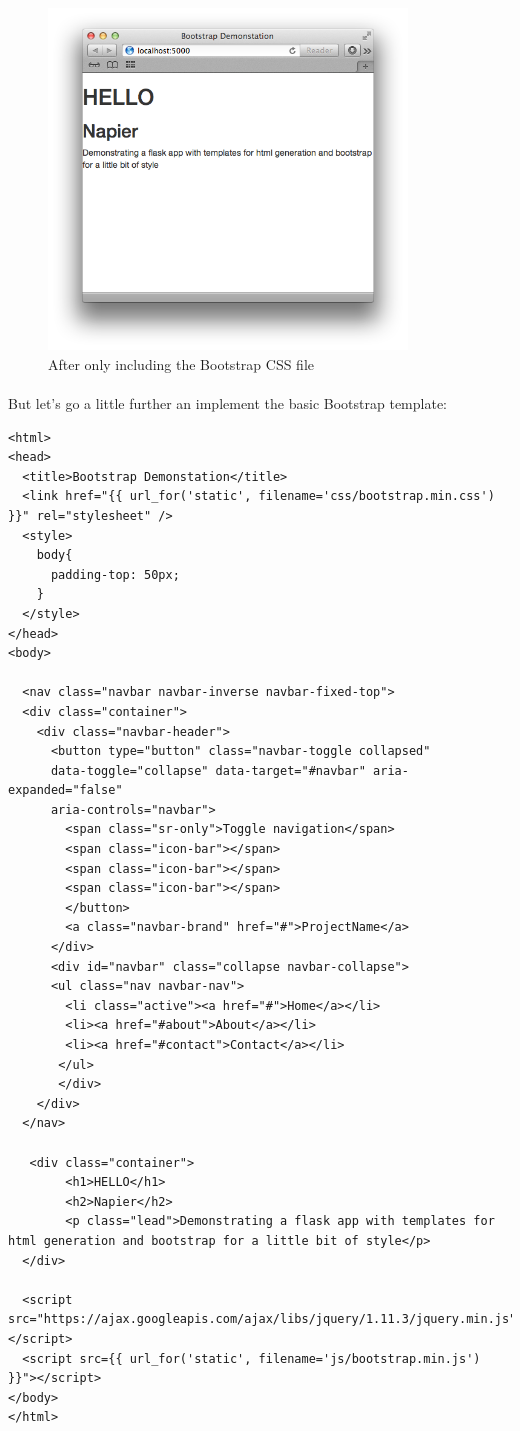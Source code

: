 \documentclass[12pt, a4paper, twoside]{book}
\begin{document}
\begin{figure}[H]
\centering
\includegraphics[width=0.85\textwidth]{images/styled-css.png}
\caption{After only including the Bootstrap CSS file}
\label{fig:styled-css}
\end{figure}

\paragraph{} But let's go a little further an implement the basic Bootstrap template:

\begin{lstlisting}
<html>
<head>
  <title>Bootstrap Demonstation</title>
  <link href="{{ url_for('static', filename='css/bootstrap.min.css') }}" rel="stylesheet" />
  <style>
    body{ 
      padding-top: 50px;
    } 
  </style>
</head>
<body>

  <nav class="navbar navbar-inverse navbar-fixed-top">
  <div class="container">
    <div class="navbar-header">
      <button type="button" class="navbar-toggle collapsed"
      data-toggle="collapse" data-target="#navbar" aria-expanded="false"
      aria-controls="navbar">
        <span class="sr-only">Toggle navigation</span>
        <span class="icon-bar"></span>
        <span class="icon-bar"></span>
        <span class="icon-bar"></span>
        </button>
        <a class="navbar-brand" href="#">ProjectName</a>
      </div>
      <div id="navbar" class="collapse navbar-collapse">
      <ul class="nav navbar-nav">
        <li class="active"><a href="#">Home</a></li>
        <li><a href="#about">About</a></li>
        <li><a href="#contact">Contact</a></li>
       </ul>
       </div>
    </div>
  </nav>

   <div class="container">
        <h1>HELLO</h1>
        <h2>Napier</h2>
        <p class="lead">Demonstrating a flask app with templates for html generation and bootstrap for a little bit of style</p>
  </div>

  <script src="https://ajax.googleapis.com/ajax/libs/jquery/1.11.3/jquery.min.js"></script>
  <script src={{ url_for('static', filename='js/bootstrap.min.js') }}"></script>
</body>
</html>
\end{lstlisting}
\end{document}
